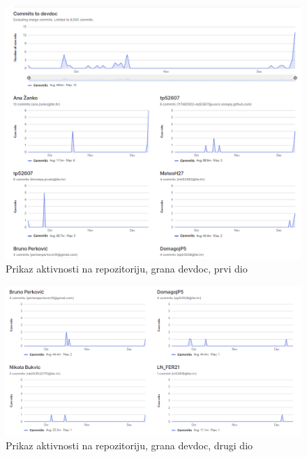          \begin{figure}[H]
			    \includegraphics[width=\textwidth]{slike/commitsDevDoc.jpg} 
			        \caption{Prikaz aktivnosti na repozitoriju, grana devdoc, prvi dio}
		\end{figure}
         \begin{figure}[H]
			    \includegraphics[width=\textwidth]{slike/commitsDevDoc2.jpg} 
			        \caption{Prikaz aktivnosti na repozitoriju, grana devdoc, drugi dio}
		\end{figure}
		
		
	